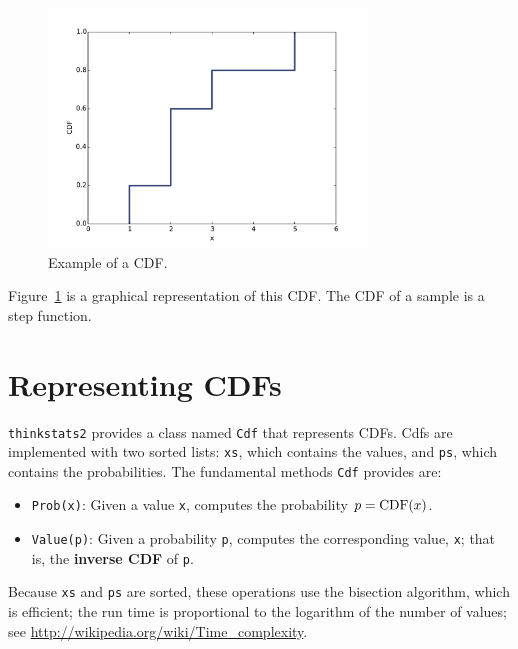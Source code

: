 \documentclass[12pt]{book}
\begin{document}
\begin{figure}
\centerline{\includegraphics[height=2.5in]{figs/cumulative_example_cdf.pdf}}
\caption{Example of a CDF.}
\label{example_cdf}
\end{figure}

Figure~\ref{example_cdf} is a graphical representation of this CDF.
The CDF of a sample is a step function.


\section{Representing CDFs}

{\tt thinkstats2} provides a class named
{\tt Cdf} that represents CDFs.
Cdfs are implemented with two sorted lists: {\tt xs}, which contains
the values, and {\tt ps}, which contains the probabilities.  The
fundamental methods {\tt Cdf} provides are:

\begin{itemize}

\item {\tt Prob(x)}: Given a value {\tt x}, computes the probability
  $p = \mathrm{CDF}(x)$.

\item {\tt Value(p)}: Given a probability {\tt p}, computes the
corresponding value, {\tt x}; that is, the {\bf inverse CDF} of {\tt p}.

\end{itemize}

Because {\tt xs} and {\tt ps} are sorted, these operations use the
bisection algorithm, which is efficient; the run time is proportional
to the logarithm of the number of values; see
\url{http://wikipedia.org/wiki/Time_complexity}.
\end{document}
